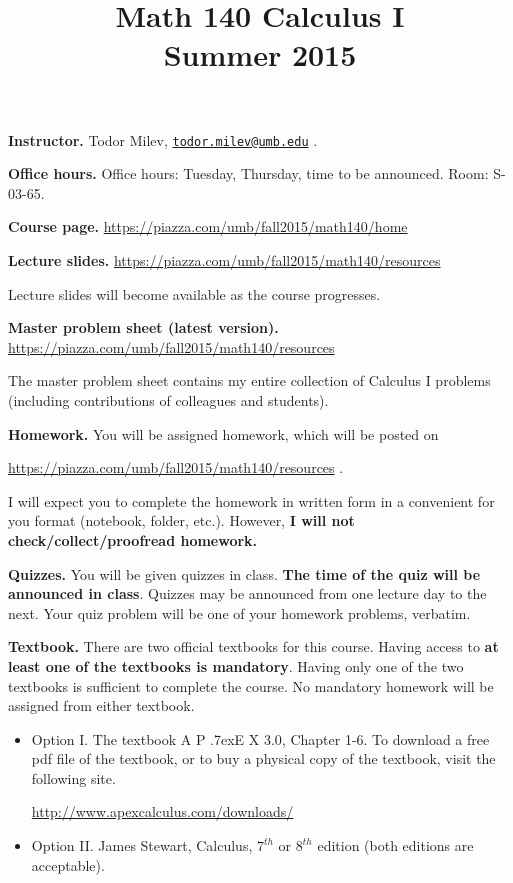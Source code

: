 \documentclass{article}
\title{Math 140 Calculus I \\ Summer 2015}
\date{}
\newcommand{\apex}{A\kern -1pt \lower -2pt\hbox{P}\kern -4pt \lower .7ex\hbox{E}\kern -1pt X}
\newcommand{\websitebase}{https://piazza.com/umb/fall2015/math140}
\begin{document}
\maketitle

\noindent \textbf{Instructor.} Todor Milev, \href{mailto:todor.milev@umb.edu}{\nolinkurl{todor.milev@umb.edu}} \quad \quad \quad .

\medskip
\noindent \textbf{Office hours. } Office hours: Tuesday, Thursday, time to be announced. Room: S-03-65.

\medskip
\noindent \textbf{Course page. }  \url{\websitebase/home}




\medskip \noindent \textbf{Lecture slides. }  \url{\websitebase/resources}

\medskip\noindent Lecture slides will become available as the course progresses.


\medskip \noindent \textbf{Master problem sheet (latest version). }  \url{\websitebase/resources} 

\medskip\noindent The master problem sheet contains my entire collection of Calculus I problems (including contributions of colleagues and students). 

\medskip
\noindent \textbf{Homework.} You will be assigned homework, which will be posted on

\url{\websitebase/resources} \quad \quad \quad .

\noindent I will expect you to complete the homework in written form in a convenient for you format (notebook, folder, etc.). However, \textbf{I will not check/collect/proofread homework.} 
 
\medskip
\noindent \textbf{Quizzes.} You will be given quizzes in class. \textbf{The time of the quiz will be announced in class}. Quizzes may be announced from one lecture day to the next. Your quiz problem will be one of your homework problems, verbatim. 





\medskip\noindent \textbf{Textbook. } There are two official textbooks for this course. Having access to \textbf{at least one of the textbooks is mandatory}. Having only one of the two textbooks is sufficient to complete the course. No mandatory homework will be assigned from either textbook. 

\begin{itemize}
\item Option I. The textbook \apex{} 3.0, Chapter 1-6. To download a free pdf file of the textbook, or to buy a physical copy of the textbook, visit the following site.

\url{http://www.apexcalculus.com/downloads/} 
\item Option II. James Stewart, Calculus, $7^{th}$ or $8^{th}$ edition (both editions are acceptable).
\end{itemize}
\end{document}
